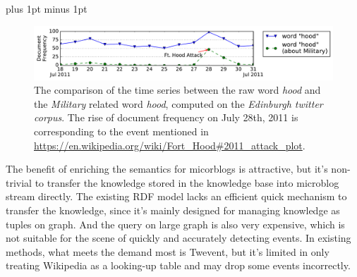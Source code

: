 \documentclass[runningheads,a4paper]{llncs}
\theoremstyle{exampstyle}
\begin{document}
\intextsep=1pt plus 1pt minus 1pt
\begin{figure}[h]
		\setlength{\abovecaptionskip}{0.cm}
        \setlength{\belowcaptionskip}{0.cm}
        \centering
        \includegraphics[width=1.0\columnwidth]{img/hood.pdf}
        \caption{The comparison of the time series between the raw word \textit{hood} and the \textit{Military} related word \textit{hood}, computed on the \textit{Edinburgh twitter corpus}\cite{petrovic2012using}. The rise of document frequency on July 28th, 2011 is corresponding to the event mentioned in \url{https://en.wikipedia.org/wiki/Fort_Hood\#2011_attack_plot}.}
        \label{fig:hood}
\end{figure}

The benefit of enriching the semantics for micorblogs is attractive, but it's non-trivial to transfer the knowledge stored in the knowledge base into microblog stream directly.
The existing RDF model\cite{klyne2006rdf} lacks an efficient quick mechanism to transfer the knowledge, since it's mainly designed for managing knowledge as tuples on graph. And the query on large graph is also very expensive\cite{huang2011scalable}, which is not suitable for the scene of quickly and accurately detecting events.
In existing methods, what meets the demand most is Twevent\cite{Twevent2012}, but it's limited in only treating Wikipedia as a looking-up table and may drop some events incorrectly.
\end{document}
